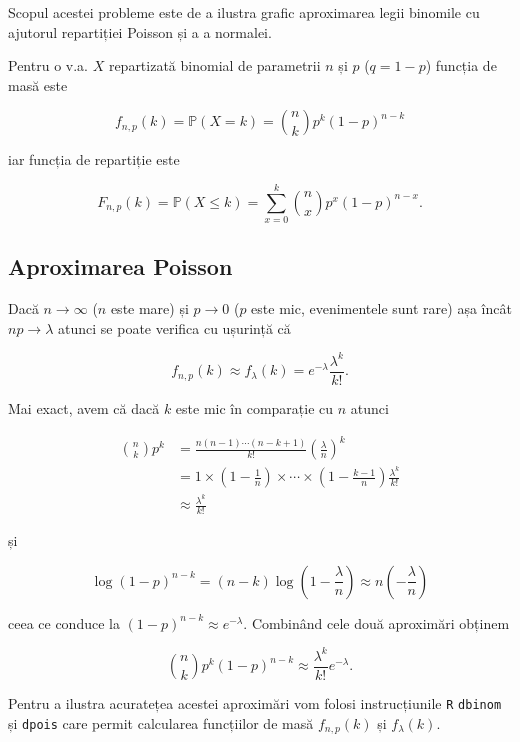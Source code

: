 \documentclass[]{article}
\begin{document}
Scopul acestei probleme este de a ilustra grafic aproximarea legii
binomile cu ajutorul repartiției Poisson și a a normalei.

Pentru o v.a. \(X\) repartizată binomial de parametrii \(n\) și \(p\)
(\(q = 1-p\)) funcția de masă este

\[
f_{n,p}(k)=\mathbb{P}(X=k)=\binom{n}{k}p^k(1-p)^{n-k}
\]

iar funcția de repartiție este

\[
F_{n,p}(k) = \mathbb{P}(X\leq k) = \sum_{x=0}^{k}\binom{n}{x}p^x(1-p)^{n-x}.
\]

\hypertarget{aproximarea-poisson}{%
\subsection{Aproximarea Poisson}\label{aproximarea-poisson}}

Dacă \(n\to\infty\) (\(n\) este mare) și \(p\to 0\) (\(p\) este mic,
evenimentele sunt rare) așa încât \(np\to\lambda\) atunci se poate
verifica cu ușurință că

\[
f_{n,p}(k)\approx f_{\lambda}(k)=e^{-\lambda}\frac{\lambda^k}{k!}.
\]

Mai exact, avem că dacă \(k\) este mic în comparație cu \(n\) atunci

\begin{align*}
  \binom{n}{k}p^k &= \frac{n(n-1)\cdots(n-k+1)}{k!}\left(\frac{\lambda}{n}\right)^k \\
                  &= 1\times\left(1-\frac{1}{n}\right)\times\cdots\times\left(1-\frac{k-1}{n}\right)\frac{\lambda^k}{k!}\\
                  &\approx \frac{\lambda^k}{k!}
\end{align*}

și

\[
  \log(1-p)^{n-k} = (n-k)\log\left(1-\frac{\lambda}{n}\right)\approx n\left(-\frac{\lambda}{n}\right)
\]

ceea ce conduce la \((1-p)^{n-k}\approx e^{-\lambda}\). Combinând cele
două aproximări obținem

\[
  \binom{n}{k}p^k(1-p)^{n-k} \approx \frac{\lambda^k}{k!}e^{-\lambda}.
\]

Pentru a ilustra acuratețea acestei aproximări vom folosi instrucțiunile
\texttt{R} \texttt{dbinom} și \texttt{dpois} care permit calcularea
funcțiilor de masă \(f_{n,p}(k)\) și \(f_{\lambda}(k)\).
\end{document}

